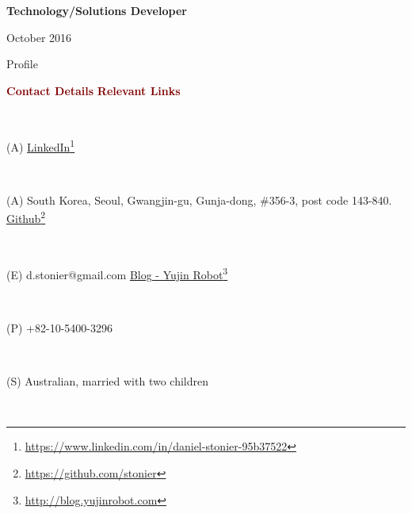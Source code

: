 \documentclass[a4paper,10pt]{article}
\begin{document}

\vspace{-2.5em}

\begin{center}
  \textbf{Technology/Solutions Developer} \\
  \begin{small} October 2016 \end{small}
\end{center}


\vspace{-2.5em}

\begin{cvsection}{Profile}

\vspace{-2em}


\rmfamily

\begin{small} \textcolor{maroon}{\textbf{Contact Details}} \hfill \textcolor{maroon}{\textbf{Relevant Links}} \end{small}  \\ 
\begin{small} (A)  \hfill \href{https://www.linkedin.com/in/daniel-stonier-95b37522}{LinkedIn}\footnote{\href{https://www.linkedin.com/in/daniel-stonier-95b37522}{https://www.linkedin.com/in/daniel-stonier-95b37522}} \end{small}  \\ 
\begin{small} (A) South Korea, Seoul, Gwangjin-gu, Gunja-dong, \#356-3, post code 143-840. \hfill \href{https://github.com/stonier}{Github}\footnote{\href{https://github.com/stonier}{https://github.com/stonier}} \end{small} \\  
\begin{small} (E) d.stonier@gmail.com \hfill \href{http://blog.yujinrobot.com/}{Blog - Yujin Robot}\footnote{\href{http://blog.yujinrobot.com/}{http://blog.yujinrobot.com}} \end{small} \\
\begin{small} (P) +82-10-5400-3296 \end{small} \\
\begin{small} (S) Australian, married with two children \end{small} \\


\end{cvsection}
\end{document}
